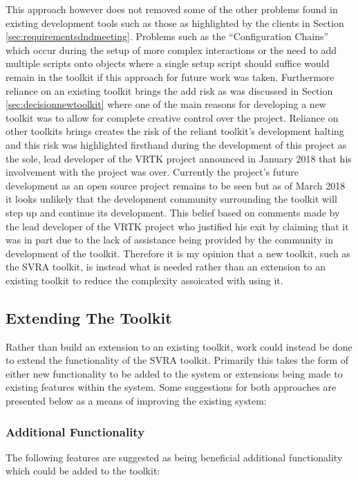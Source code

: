 \documentclass{l4proj}
\begin{document}
This approach however does not removed some of the other problems found in existing development tools such as those as highlighted by the clients in Section \ref{sec:requirementsdndmeeting}. Problems such as the ``Configuration Chains'' which occur during the setup of more complex interactions or the need to add multiple scripts onto objects where a single setup script should suffice would remain in the toolkit if this approach for future work was taken. Furthermore reliance on an existing toolkit brings the add risk as was discussed in Section \ref{sec:decisionnewtoolkit} where one of the main reasons for developing a new toolkit was to allow for complete creative control over the project. Reliance on other toolkits brings creates the risk of the reliant toolkit's development halting and this risk was highlighted firsthand during the development of this project as the sole, lead developer of the VRTK project announced in January 2018 that his involvement with the project was over. Currently the project's future development as an open source project remains to be seen but as of March 2018 it looks unlikely that the development community surrounding the toolkit will step up and continue its development. This belief based on comments made by the lead developer of the VRTK project who justified his exit by claiming that it was in part due to the lack of assistance being provided by the community in development of the toolkit. Therefore it is my opinion that a new toolkit, such as the SVRA toolkit, is instead what is needed rather than an extension to an existing toolkit to reduce the complexity assoicated with using it. 

\subsection{Extending The Toolkit}
\label{sec:conclusionextendingtoolkit}
Rather than build an extension to an existing toolkit, work could instead be done to extend the functionality of the SVRA toolkit. Primarily this takes the form of either new functionality to be added to the system or extensions being made to existing features within the system. Some suggestions for both approaches are presented below as a means of improving the existing system:

\subsubsection{Additional Functionality}
The following features are suggested as being beneficial additional functionality which could be added to the toolkit:
\end{document}
